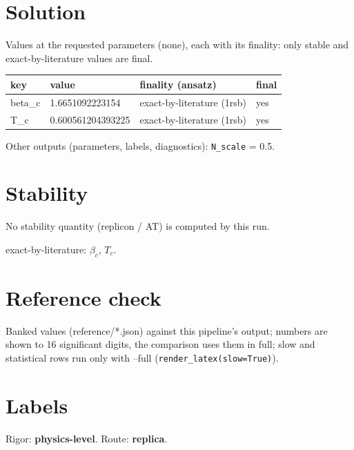 \documentclass[11pt]{article}
\begin{document}
\section{Solution}
Values at the requested parameters (none), each with its finality: only stable and exact-by-literature values are final.
\begin{center}
\begin{tabular}{llll}
key & value & finality (ansatz) & final \\
\hline
beta\_c & 1.6651092223154 & exact-by-literature (1rsb) \cite{b4,b2,b5} & yes \\
T\_c & 0.600561204393225 & exact-by-literature (1rsb) \cite{b4,b2,b5} & yes \\
\end{tabular}
\end{center}
Other outputs (parameters, labels, diagnostics): \texttt{N\_scale} = 0.5.

\section{Stability}
No stability quantity (replicon / AT) is computed by this run.

exact-by-literature: $\beta _{c}$, $T_{c}$.

\section{Reference check}
Banked values (reference/*.json) against this pipeline's output; numbers are shown to 16 significant digits, the comparison uses them in full; slow and statistical rows run only with --full (\texttt{render\_latex(slow=True)}).
\begin{center}\footnotesize
\setlength{\tabcolsep}{4pt}
\end{center}
\section{Labels}
Rigor: \textbf{physics-level}. Route: \textbf{replica}.
\end{document}
